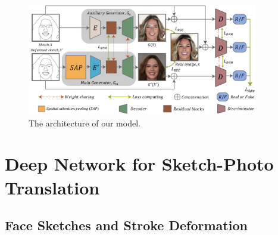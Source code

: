 


\begin{figure}[tb]
	\includegraphics[width=0.9\textwidth]{figs/architecture}
	\caption{The architecture of our model.}
	\label{fig:architecture}
\end{figure}
%

\section{Deep Network for Sketch-Photo Translation}
\label{sec:network}

%



\subsection{Face Sketches and Stroke Deformation}
\label{subsec:algorithm_data}



